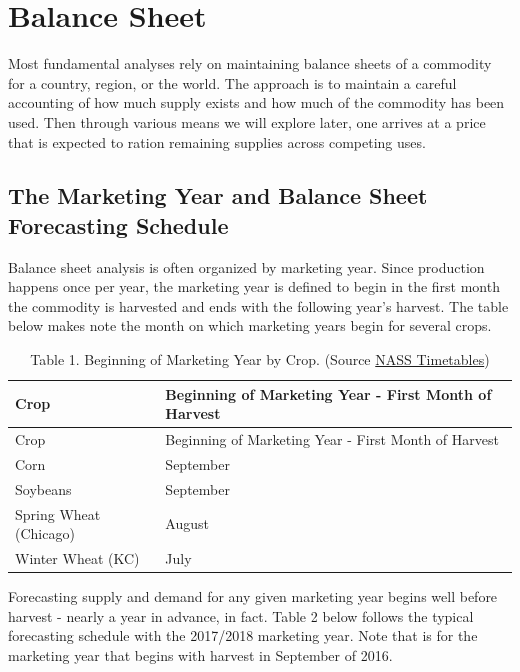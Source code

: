 \documentclass[
]{book}
\begin{document}
\hypertarget{balance-sheet}{%
\section{Balance Sheet}\label{balance-sheet}}

Most fundamental analyses rely on maintaining balance sheets of a commodity for a country, region, or the world. The approach is to maintain a careful accounting of how much supply exists and how much of the commodity has been used. Then through various means we will explore later, one arrives at a price that is expected to ration remaining supplies across competing uses.

\hypertarget{the-marketing-year-and-balance-sheet-forecasting-schedule}{%
\subsection{The Marketing Year and Balance Sheet Forecasting Schedule}\label{the-marketing-year-and-balance-sheet-forecasting-schedule}}

Balance sheet analysis is often organized by marketing year. Since production happens once per year, the marketing year is defined to begin in the first month the commodity is harvested and ends with the following year's harvest. The table below makes note the month on which marketing years begin for several crops.

\begin{longtable}[]{@{}ll@{}}
\caption{Table 1. Beginning of Marketing Year by Crop. (Source \href{http://www.nass.usda.gov/Publications/National_Crop_Progress/}{NASS Timetables})}\tabularnewline
\toprule
Crop & Beginning of Marketing Year - First Month of Harvest\tabularnewline
\midrule
\endfirsthead
\toprule
Crop & Beginning of Marketing Year - First Month of Harvest\tabularnewline
\midrule
\endhead
Corn & September\tabularnewline
Soybeans & September\tabularnewline
Spring Wheat (Chicago) & August\tabularnewline
Winter Wheat (KC) & July\tabularnewline
\bottomrule
\end{longtable}

Forecasting supply and demand for any given marketing year begins well before harvest - nearly a year in advance, in fact. Table 2 below follows the typical forecasting schedule with the 2017/2018 marketing year. Note that is for the marketing year that begins with harvest in September of 2016.
\end{document}
